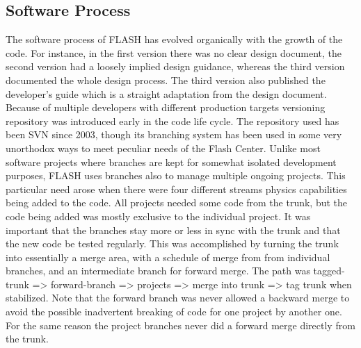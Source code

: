 \subsection{Software Process}
The software process of FLASH has evolved organically with the growth
of the code. For instance, in the first version there was no clear
design document, the second version had a loosely implied design
guidance, whereas the third version documented the whole design
process. The third version also published the developer's guide which
is a straight adaptation from the design document. Because of multiple
developers with different production targets versioning repository was
introduced early in the code life cycle. The repository used has been
SVN since 2003, though its branching system has been used in some very
unorthodox ways to meet peculiar needs of the Flash Center. Unlike
most software projects where branches are kept for somewhat isolated
development purposes, FLASH uses branches also to manage multiple
ongoing projects. This particular need arose when there were four
different streams physics capabilities being added to the code. All
projects needed some code from the trunk, but the code being added was
mostly exclusive to the individual project. It was important that the
branches stay more or less in sync with the trunk and that the new
code be tested regularly. This was accomplished by turning the trunk
into essentially a merge area, with a schedule of merge from from
individual branches, and an intermediate branch for forward merge. The
path was tagged-trunk => forward-branch => projects => merge into
trunk => tag trunk when stabilized. Note that the forward branch was
never allowed a backward merge to avoid the possible inadvertent
breaking of code for one project by another one. For the same reason
the project branches never did a forward merge directly from the
trunk. 

